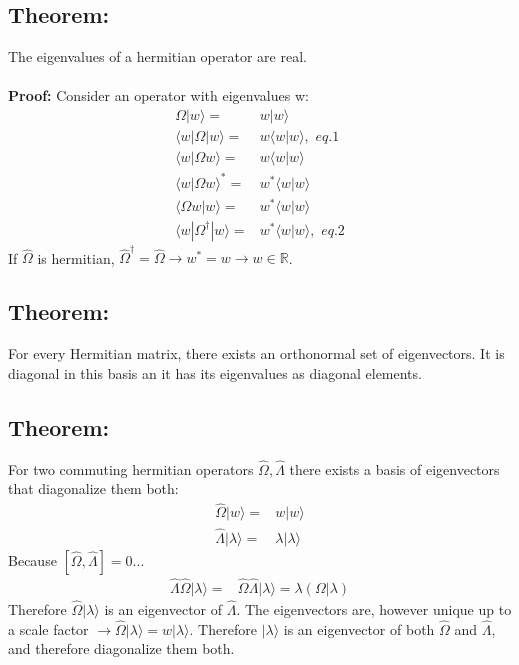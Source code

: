 \documentclass[12pt]{article}
\begin{document}
\subsection*{Theorem:}
The eigenvalues of a hermitian operator are real.\\
\\
\textbf{Proof:} Consider an operator with eigenvalues w:
\begin{align*}
\Omega|w\rangle =& w|w\rangle
\\
\langle w|\Omega |w\rangle =& w\langle w|w\rangle, \,\, eq.1
\\
\langle w|\Omega w\rangle =& w\langle w|w\rangle
\\
\langle w|\Omega w\rangle^* =& w^*\langle w|w\rangle
\\
\langle\Omega w| w\rangle =& w^*\langle w|w\rangle
\\
\langle w|\Omega^\dagger| w\rangle =& w^*\langle w|w\rangle, \,\,eq.2
\end{align*}
If $\hat{\Omega}$ is hermitian, $\hat{\Omega}^\dagger = \hat{\Omega} \rightarrow w^* = w \rightarrow w \in \mathbb{R}$.
\subsection*{Theorem:}
For every Hermitian matrix, there exists an orthonormal set of eigenvectors. It is diagonal in this basis an it has its eigenvalues as diagonal elements.
\subsection*{Theorem:}
For two commuting hermitian operators $\hat{\Omega}, \hat{\Lambda}$ there exists a basis of eigenvectors that diagonalize them both:
\begin{align*}
\hat{\Omega}|w\rangle =& w|w\rangle
\\
\hat{\Lambda}|\lambda\rangle =& \lambda|\lambda	\rangle
\end{align*}
Because $\left[\hat{\Omega},\hat{\Lambda}\right]=0$...
\begin{align*}
\hat{\Lambda}\hat{\Omega}|\lambda\rangle =& \hat{\Omega}\hat{\Lambda}|\lambda\rangle = \lambda(\Omega|\lambda)
\end{align*} 
Therefore $\hat{\Omega}|\lambda\rangle$ is an eigenvector of $\hat{\Lambda}$. The eigenvectors are, however unique up to a scale factor $\rightarrow \hat{\Omega}|\lambda\rangle = w|\lambda\rangle$. Therefore $|\lambda\rangle$ is an eigenvector of both $\hat{\Omega}$ and $\hat{\Lambda}$, and therefore diagonalize them both.  
\end{document}
